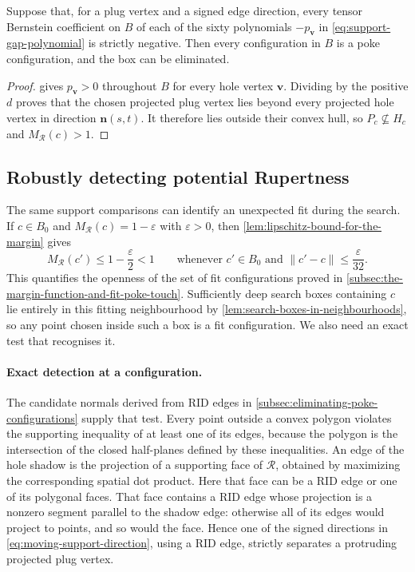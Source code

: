 \begin{proposition}\label{prop:soundness-of-the-global-component}
  Suppose that, for a plug vertex and a signed edge direction, every
  tensor Bernstein coefficient on $B$ of each of the sixty polynomials
  $-p_{\mathbf v}$ in \cref{eq:support-gap-polynomial} is strictly negative.
  Then every configuration in $B$ is a poke configuration, and the box can be eliminated.
\end{proposition}
\begin{proof}
   gives $p_{\mathbf v}>0$ throughout $B$ for
  every hole vertex $\mathbf v$. Dividing by the positive $d$ proves that the
  chosen projected plug vertex lies beyond every projected hole vertex in
  direction $\mathbf n(s,t)$. It therefore lies outside their convex hull, so
  $P_c\nsubseteq H_c$ and $M_{\mathcal R}(c)>1$.
\end{proof}

\subsection{Robustly detecting potential Rupertness}\label{subsec:robustly-detecting-potential-rupertness}

The same support comparisons can identify an unexpected fit during the
search. If $c\in B_0$ and $M_{\mathcal R}(c)=1-\varepsilon$ with
$\varepsilon>0$, then
\cref{lem:lipschitz-bound-for-the-margin} gives
\[
  M_{\mathcal R}(c')\le1-\frac{\varepsilon}{2}<1
  \qquad\text{whenever }c'\in B_0\text{ and }
         \lVert c'-c\rVert\le\frac{\varepsilon}{32}.
\]
This quantifies the openness of the set of fit configurations proved in
\cref{subsec:the-margin-function-and-fit-poke-touch}. Sufficiently deep search boxes
containing $c$ lie entirely in this fitting neighbourhood by
\cref{lem:search-boxes-in-neighbourhoods}, so any point
chosen inside such a box is a fit configuration. We also need an exact
test that recognises it.

\paragraph{Exact detection at a configuration.}
The candidate normals derived from RID edges in \cref{subsec:eliminating-poke-configurations}
supply that test.
Every point outside a convex polygon violates the supporting inequality of
at least one of its edges, because the polygon is the intersection of the
closed half-planes defined by these inequalities.
An edge of the hole shadow is the projection of a supporting face of
$\mathcal R$, obtained by maximizing the corresponding spatial dot product.
Here that face can be a RID edge or one of its polygonal faces.
That face contains a RID edge whose projection is a nonzero segment
parallel to the shadow edge: otherwise all of its edges would project to
points, and so would the face. Hence one of the signed directions in
\cref{eq:moving-support-direction}, using a RID edge, strictly separates
a protruding projected plug vertex.

